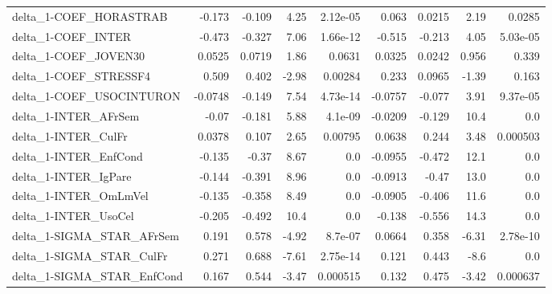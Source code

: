 \begin{tabular}{lrrrrrrrr}
delta\_1-COEF\_HORASTRAB                &      -0.173 &       -0.109 &    4.25 & 2.12e-05 &      0.063 &      0.0215 &         2.19 &        0.0285 \\
delta\_1-COEF\_INTER                    &      -0.473 &       -0.327 &    7.06 & 1.66e-12 &     -0.515 &      -0.213 &         4.05 &      5.03e-05 \\
delta\_1-COEF\_JOVEN30                  &      0.0525 &       0.0719 &    1.86 &   0.0631 &     0.0325 &      0.0242 &        0.956 &         0.339 \\
delta\_1-COEF\_STRESSF4                 &       0.509 &        0.402 &   -2.98 &  0.00284 &      0.233 &      0.0965 &        -1.39 &         0.163 \\
delta\_1-COEF\_USOCINTURON              &     -0.0748 &       -0.149 &    7.54 & 4.73e-14 &    -0.0757 &      -0.077 &         3.91 &      9.37e-05 \\
delta\_1-INTER\_AFrSem                  &       -0.07 &       -0.181 &    5.88 &  4.1e-09 &    -0.0209 &      -0.129 &         10.4 &           0.0 \\
delta\_1-INTER\_CulFr                   &      0.0378 &        0.107 &    2.65 &  0.00795 &     0.0638 &       0.244 &         3.48 &      0.000503 \\
delta\_1-INTER\_EnfCond                 &      -0.135 &        -0.37 &    8.67 &      0.0 &    -0.0955 &      -0.472 &         12.1 &           0.0 \\
delta\_1-INTER\_IgPare                  &      -0.144 &       -0.391 &    8.96 &      0.0 &    -0.0913 &       -0.47 &         13.0 &           0.0 \\
delta\_1-INTER\_OmLmVel                 &      -0.135 &       -0.358 &    8.49 &      0.0 &    -0.0905 &      -0.406 &         11.6 &           0.0 \\
delta\_1-INTER\_UsoCel                  &      -0.205 &       -0.492 &    10.4 &      0.0 &     -0.138 &      -0.556 &         14.3 &           0.0 \\
delta\_1-SIGMA\_STAR\_AFrSem             &       0.191 &        0.578 &   -4.92 &  8.7e-07 &     0.0664 &       0.358 &        -6.31 &      2.78e-10 \\
delta\_1-SIGMA\_STAR\_CulFr              &       0.271 &        0.688 &   -7.61 & 2.75e-14 &      0.121 &       0.443 &         -8.6 &           0.0 \\
delta\_1-SIGMA\_STAR\_EnfCond            &       0.167 &        0.544 &   -3.47 & 0.000515 &      0.132 &       0.475 &        -3.42 &      0.000637 \\

\end{tabular}
